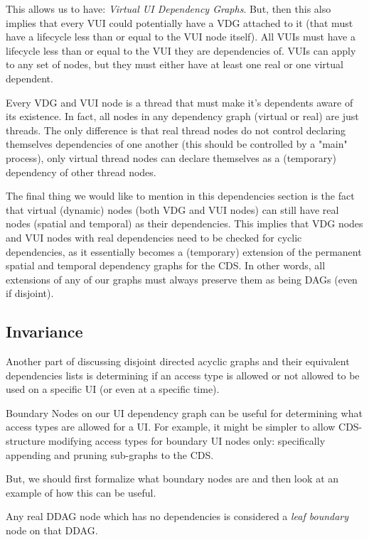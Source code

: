 This allows us to have: \textit{Virtual UI Dependency Graphs}. But, then this also implies that every VUI could potentially have a VDG attached to it (that must have a lifecycle less than or equal to the VUI node itself). All VUIs must have a lifecycle less than or equal to the VUI they are dependencies of. VUIs can apply to any set of nodes, but they must either have at least one real or one virtual dependent.

Every VDG and VUI node is a thread that must make it's dependents aware of its existence. In fact, all nodes in any dependency graph (virtual or real) are just threads. The only difference is that real thread nodes do not control declaring themselves dependencies of one another (this should be controlled by a "main" process), only virtual thread nodes can declare themselves as a (temporary) dependency of other thread nodes.

The final thing we would like to mention in this dependencies section is the fact that virtual (dynamic) nodes (both VDG and VUI nodes) can still have real nodes (spatial and temporal) as their dependencies. This implies that VDG nodes and VUI nodes with real dependencies need to be checked for cyclic dependencies, as it essentially becomes a (temporary) extension of the permanent spatial and temporal dependency graphs for the CDS. In other words, all extensions of any of our graphs must always preserve them as being DAGs (even if disjoint).

\subsection{Invariance}

Another part of discussing disjoint directed acyclic graphs and their equivalent dependencies lists is determining if an access type is allowed or not allowed to be used on a specific UI (or even at a specific time).

Boundary Nodes on our UI dependency graph can be useful for determining what access types are allowed for a UI. For example, it might be simpler to allow CDS-structure modifying access types for boundary UI nodes only: specifically appending and pruning sub-graphs to the CDS. 

But, we should first formalize what boundary nodes are and then look at an example of how this can be useful.

\begin{con-def}
	\label{leaf-boundaries}
	Any real DDAG node which has no dependencies is considered a \textit{leaf boundary} node on that DDAG.
\end{con-def}


